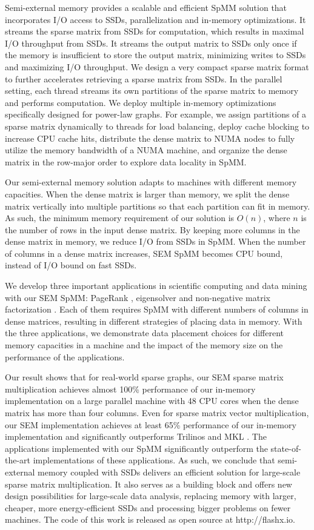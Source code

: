Semi-external memory provides a scalable and efficient SpMM solution that
incorporates I/O access to SSDs, parallelization and in-memory optimizations.
It streams the sparse matrix from SSDs for computation, which results in maximal
I/O throughput from SSDs. It streams the output matrix to SSDs only once if
the memory is insufficient to store the output matrix, minimizing writes to
SSDs and maximizing I/O throughput. We design a very compact sparse matrix
format to further accelerates retrieving a sparse
matrix from SSDs. In the parallel setting, each thread streams its own
partitions of the sparse matrix to memory and performs computation.
We deploy multiple in-memory optimizations specifically designed for power-law
graphs. For example, we assign partitions of a sparse matrix dynamically to
threads for load balancing, deploy cache blocking to increase CPU cache hits,
distribute the dense matrix to NUMA nodes to fully utilize the memory
bandwidth of a NUMA machine, and organize the dense matrix in the row-major
order to explore data locality in SpMM.

Our semi-external memory solution adapts to machines with different memory
capacities. When the dense matrix is larger than memory, we split the dense
matrix vertically into multiple partitions so that each partition can fit in
memory. As such, the minimum memory requirement of our solution is $O(n)$,
where $n$ is the number of rows in the input dense matrix. By keeping more columns
in the dense matrix in memory, we reduce I/O from SSDs in SpMM. When the number
of columns in a dense matrix increases, SEM SpMM becomes CPU bound, instead of
I/O bound on fast SSDs.

We develop three important applications in scientific computing and data mining
with our SEM SpMM: PageRank \cite{pagerank}, eigensolver \cite{anasazi} and
non-negative matrix factorization \cite{nmf}. Each of them requires SpMM with
different numbers of columns in dense matrices, resulting in different
strategies of placing data in memory. With the three applications, we
demonstrate data placement choices for different memory capacities in a machine
and the impact of the memory size on the performance of the applications.


Our result shows that for real-world sparse graphs, our SEM sparse matrix
multiplication achieves almost 100\% performance of our in-memory implementation
on a large parallel machine with 48 CPU cores
when the dense matrix has more than four columns. Even for sparse matrix vector
multiplication, our SEM implementation achieves at least 65\% performance of
our in-memory implementation and significantly outperforms Trilinos \cite{trilinos}
and MKL \cite{mkl}. The applications implemented with our SpMM significantly
outperform the state-of-the-art implementations of these applications. As such,
we conclude that semi-external memory coupled with SSDs delivers an efficient
solution for large-scale sparse matrix multiplication. It also serves
as a building block and offers new design possibilities for large-scale
data analysis, replacing memory with larger, cheaper, more energy-efficient SSDs
and processing bigger problems on fewer machines. The code of this work is
released as open source at http://flashx.io.
